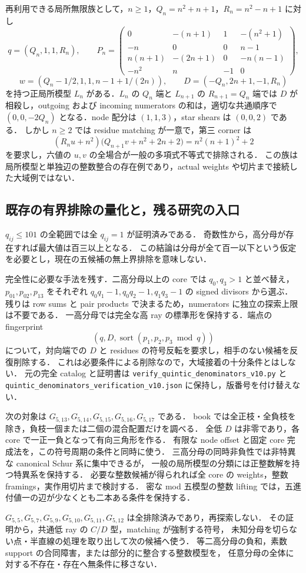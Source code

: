 再利用できる局所無限族として，$n\geq1$，$Q_n=n^2+n+1$，$R_n=n^2-n+1$ に対し
\[
 q=(Q_n,1,1,R_n),\qquad
 P_n=\begin{pmatrix}
 0&-(n+1)&1&-(n^2+1)\\
 -n&0&0&n-1\\
 n(n+1)&-(2n+1)&0&-n(n-1)\\
 -n^2&n&-1&0
 \end{pmatrix},
\]
\[
 w=(Q_n-1/2,1,1,n-1+1/(2n)),\qquad
 D=(-Q_n,2n+1,-1,R_n)
\]
を持つ正局所模型 $L_n$ がある．$L_n$ の $Q_n$ 端と $L_{n+1}$ の $R_{n+1}=Q_n$ 端では
$D$ が相殺し，outgoing および incoming numerators の和は，適切な共通順序で
$(0,0,-2Q_n)$ となる．node 配分は $(1,1,3)$，star shears は $(0,0,2)$ である．
しかし $n\geq2$ では residue matching が一意で，第三 corner は
\[
 (R_nu+n^2)\bigl(Q_{n+1}v+n^2+2n+2\bigr)
   =n^2(n+1)^2+2
\]
を要求し，六値の $u,v$ の全場合が一般の多項式不等式で排除される．
この族は局所模型と単独辺の整数整合の存在例であり，actual weights や切片まで接続した大域例ではない．

\subsection{既存の有界排除の量化と，残る研究の入口}

$q_{ij}\le101$ の全範囲では全 $q_{ij}=1$ が証明済みである．
奇数性から，高分母が存在すれば最大値は百三以上となる．
この結論は分母が全て百一以下という仮定を必要とし，現在の五候補の無上界排除を意味しない．

完全性に必要な手法を残す．二高分母以上の core では $q_0,q_3>1$ と並べ替え，
$p_{01},p_{02},p_{13}$ をそれぞれ $q_0q_1-1,q_0q_2-1,q_1q_3-1$ の signed divisors から選ぶ．
残りは row sums と pair products で決まるため，numerators に独立の探索上限は不要である．
一高分母では完全な高 ray の標準形を保持する．端点の fingerprint
\[
 \left(q,D,\operatorname{sort}(p_1,p_2,p_3\bmod q)\right)
\]
について，対向端での $D$ と residues の符号反転を要求し，相手のない候補を反復削除する．
これは必要条件による削除なので，大域接着の十分条件とはしない．
元の完全 catalog と証明書は
\nolinkurl{verify_quintic_denominators_v10.py} と
\nolinkurl{quintic_denominators_verification_v10.json} に保持し，版番号を付け替えない．

次の対象は $G_{5,13},G_{5,14},G_{5,15},G_{5,16},G_{5,17}$ である．
book では全正枝・全負枝を除き，負枝一個または二個の混合配置だけを調べる．
全低 $D$ は非零であり，各 core で一正一負となって有向三角形を作る．
有限な node offset と固定 core 完成法を，この符号周期の条件と同時に使う．
三高分母の同時非負性では非特異な canonical Schur 系に集中できるが，
一般の局所模型の分類には正整数解を持つ特異系を保持する．
必要な整数候補が得られれば全 core の weights，整数 framings，実作用切片まで検討する．
密な mod 五模型の整数 lifting では，五進付値一の辺が少なくとも二本ある条件を保持する．

$G_{5,5},G_{5,7},G_{5,9},G_{5,10},G_{5,11},G_{5,12}$ は全排除済みであり，再探索しない．
その証明から，共通低 ray の $C/D$ 型，matching が強制する符号，
未知分母を切らない点・半直線の処理を取り出して次の候補へ使う．
等二高分母の負和，素数 support の合同障害，または部分的に整合する整数模型を，
任意分母の全体に対する不存在・存在へ無条件に移さない．
